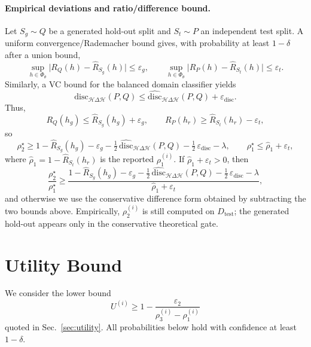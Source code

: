 \paragraph{Empirical deviations and ratio/difference bound.}
Let $S_g\sim Q$ be a generated hold-out split and $S_t\sim P$ an independent test split. A uniform convergence/Rademacher bound gives, with probability at least $1-\delta$ after a union bound,
\begin{equation}
\sup_{h\in\Phi_\theta}\bigl|R_Q(h)-\hat R_{S_g}(h)\bigr|\le \varepsilon_g,
\qquad
\sup_{h\in\Phi_\theta}\bigl|R_P(h)-\hat R_{S_t}(h)\bigr|\le \varepsilon_t.
\end{equation}
Similarly, a VC bound for the balanced domain classifier yields
\[
\mathrm{disc}_{\mathcal H\Delta\mathcal H}(P,Q)\le
\widehat{\mathrm{disc}}_{\mathcal H\Delta\mathcal H}(P,Q)+\varepsilon_{\mathrm{disc}}.
\]
Thus,
\[
R_Q(h_g)\le \hat R_{S_g}(h_g)+\varepsilon_g,
\qquad
R_P(h_r)\ge \hat R_{S_t}(h_r)-\varepsilon_t,
\]
so
\begin{equation}
\rho_2^\star \ge 1-\hat R_{S_g}(h_g)-\varepsilon_g-\tfrac12\,\widehat{\mathrm{disc}}_{\mathcal H\Delta\mathcal H}(P,Q)-\tfrac12\,\varepsilon_{\mathrm{disc}}-\lambda,
\qquad
\rho_1^\star \le \hat\rho_1+\varepsilon_t,
\end{equation}
where $\hat\rho_1=1-\hat R_{S_t}(h_r)$ is the reported $\rho_1^{(i)}$. If
$\hat\rho_1+\varepsilon_t>0$, then
\begin{equation}
\frac{\rho_2^\star}{\rho_1^\star}\ge
\frac{1-\hat R_{S_g}(h_g)-\varepsilon_g-\tfrac12\,\widehat{\mathrm{disc}}_{\mathcal H\Delta\mathcal H}(P,Q)-\tfrac12\,\varepsilon_{\mathrm{disc}}-\lambda}{\hat\rho_1+\varepsilon_t},
\end{equation}
and otherwise we use the conservative difference form obtained by subtracting the two bounds above. Empirically, $\rho_2^{(i)}$ is still computed on $D_{\text{test}}$; the generated hold-out appears only in the conservative theoretical gate.

\section{Utility Bound}
\label{app:theory-utility}
\label{appendix:utility-bound}

We consider the lower bound
\begin{equation}
U^{(i)} \ge 1-\frac{\varepsilon_2}{\rho_3^{(i)}-\rho_1^{(i)}}
\tag{A.1}\label{eq:utility-main}
\end{equation}
quoted in Sec.~\ref{sec:utility}. All probabilities below hold with confidence at least $1-\delta$.

